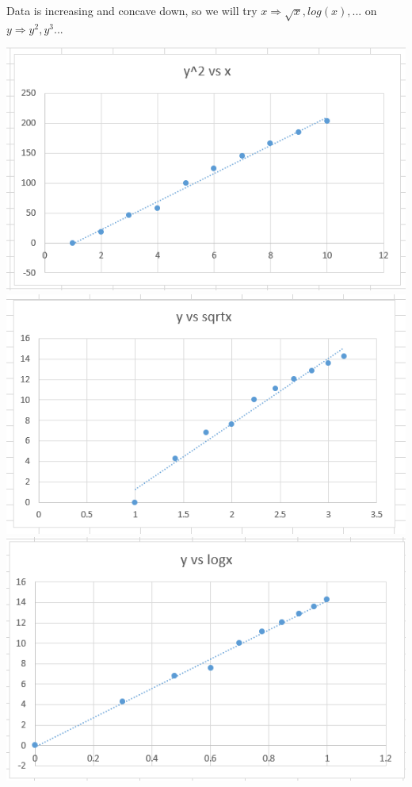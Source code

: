 \documentclass{article}
\begin{document}
\begin{enumerate}[1.]
Data is increasing and concave down, so we will try $x \Rightarrow \sqrt{x}, log(x), ...$ on $y \Rightarrow y^2, y^3...$

\includegraphics{a2_q3_graph1} \\
\includegraphics{a2_q3_graph2} \\
\includegraphics{a2_q3_graph3}



\end{enumerate}
\end{document}
